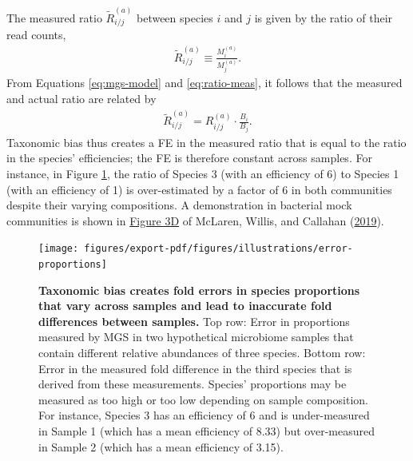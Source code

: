 \documentclass[
]{article}
\begin{document}
The measured ratio \(\tilde R_{i/j}^{(a)}\) between species \(i\) and \(j\) is given by the ratio of their read counts,
\begin{align}
  \label{eq:ratio-meas}
  \tilde R_{i/j}^{(a)} \equiv \frac{M_{i}^{(a)}}{M_{j}^{(a)}}.
\end{align}
From Equations \eqref{eq:mgs-model} and \eqref{eq:ratio-meas}, it follows that the measured and actual ratio are related by
\begin{align}
  \label{eq:ratio-error}
  \tilde R_{i/j}^{(a)} = R_{i/j}^{(a)} \cdot \frac{B_i}{B_j}.
\end{align}
Taxonomic bias thus creates a FE in the measured ratio that is equal to the ratio in the species' efficiencies; the FE is therefore constant across samples.
For instance, in Figure \ref{fig:error-proportions}, the ratio of Species 3 (with an efficiency of 6) to Species 1 (with an efficiency of 1) is over-estimated by a factor of 6 in both communities despite their varying compositions.
A demonstration in bacterial mock communities is shown in \href{https://doi.org/10.7554/eLife.46923.004}{Figure 3D} of McLaren, Willis, and Callahan (\protect\hyperlink{ref-mclaren2019cons}{2019}).

\begin{figure}
\texttt{[image: figures/export-pdf/figures/illustrations/error-proportions]} \caption{\textbf{Taxonomic bias creates fold errors in species proportions that vary across samples and lead to inaccurate fold differences between samples.} Top row: Error in proportions measured by MGS in two hypothetical microbiome samples that contain different relative abundances of three species. Bottom row: Error in the measured fold difference in the third species that is derived from these measurements. Species' proportions may be measured as too high or too low depending on sample composition. For instance, Species 3 has an efficiency of 6 and is under-measured in Sample 1 (which has a mean efficiency of 8.33) but over-measured in Sample 2 (which has a mean efficiency of 3.15).}\label{fig:error-proportions}
\end{figure}
\end{document}
